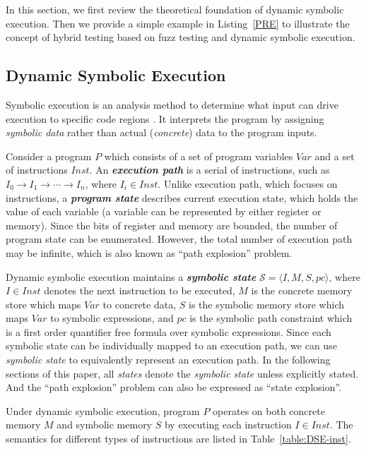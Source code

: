 \documentclass{cta-author}
\begin{document}
In this section, we first review the theoretical foundation of dynamic
symbolic execution. Then we provide a simple example in
Listing~\ref{PRE} to illustrate the concept of hybrid testing based on
fuzz testing and dynamic symbolic execution.

\subsection{Dynamic Symbolic Execution}

Symbolic execution is an analysis method to determine what input can
drive execution to specific code regions \cite{King:Symbex}. It
interprets the program by assigning \textit{symbolic data} rather than
actual (\textit{concrete}) data to the program inputs.

Consider a program $P$ which consists of a set of program variables
$Var$ and a set of instructions $Inst$. 
An \textbf{\textit{execution path}} is a serial of instructions, such as 
$I_0\rightarrow I_1 \rightarrow \cdots\rightarrow I_n$, where $I_i\in Inst$.
Unlike execution path, which focuses on instructions, a 
\textbf{\textit{program state}} describes current execution state, which
holds the value of each variable (a variable 
can be represented by either register or memory).
Since the bits of register and memory are bounded, the number of program
state can be enumerated. However, the total number of execution path 
may be infinite, which is also known as ``path explosion'' problem.

Dynamic symbolic execution
maintains a \textbf{\textit{symbolic state}} 
$\mathcal{S}=\langle I,M,S,pc\rangle$, where 
$I\in Inst$ denotes the next instruction to be executed, 
$M$ is the concrete memory store which maps $Var$ to concrete data, 
$S$ is the symbolic memory store which maps $Var$ to symbolic expressions, 
and $pc$ is the symbolic path constraint which is a first order 
quantifier free formula over symbolic expressions. Since each symbolic state 
can be individually mapped to an execution path, we can use \textit{symbolic state} 
to equivalently represent an execution path.
In the following sections of this paper, all \textit{states} 
denote the \textit{symbolic state} unless explicitly stated. 
And the ``path explosion'' problem can also be expressed as ``state explosion''.

Under dynamic symbolic execution, program $P$ operates on both concrete
memory $M$ and symbolic memory $S$ by executing each instruction $I\in
Inst$. The semantics for different types of instructions are listed in
Table~\ref{table:DSE-inst}.
\end{document}
